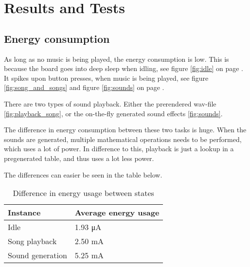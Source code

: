 \section{Results and Tests}

\subsection{Energy consumption}

As long as no music is being played, the energy consumption is low. This is because the board goes into deep sleep when idling, see figure \ref{fig:idle} on page \pageref{fig:idle}.
It spikes upon button presses, when music is being played, see figure \ref{fig:song_and_songs} and figure \ref{fig:sounds} on page \pageref{fig:song_and_songs}.

There are two types of sound playback.
Either the prerendered wav-file \ref{fig:playback_song}, or the on-the-fly generated sound effects \ref{fig:sounds}.

The difference in energy consumption between these two tasks is huge.
When the sounds are generated, multiple mathematical operations needs to be performed, which uses a lot of power.
In difference to this, playback is just a lookup in a pregenerated table, and thus uses a lot less power.

The differences can easier be seen in the table below.

\begin{table}[ht!]
    \begin{center}
    \begin{tabular}{ | l | l | }
        \hline
        Instance            & Average energy usage \\
        \hline
        Idle                & 1.93 \si{\micro\ampere} \\
        \hline
        Song playback       & 2.50 \si{\milli\ampere} \\
        \hline
        Sound generation    & 5.25 \si{\milli\ampere} \\
        \hline
    \end{tabular}
    \caption{Difference in energy usage between states}
    \label{tab:energy_usage}
    \end{center}
\end{table}
